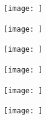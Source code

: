 \documentclass{article}
\begin{document}
\begin{center}
\texttt{[image:  ]}
\end{center}
\newpage

\begin{center}
\texttt{[image:  ]}
\end{center}
\newpage

\begin{center}
\texttt{[image:  ]}
\end{center}
\newpage

\begin{center}
\texttt{[image:  ]}
\end{center}
\newpage

\begin{center}
\texttt{[image:  ]}
\end{center}
\newpage

\begin{center}
\texttt{[image:  ]}
\end{center}
\newpage
\end{document}
